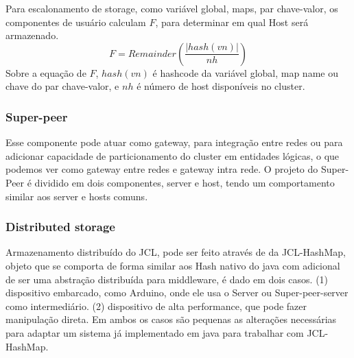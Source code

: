 \documentclass[12pt]{article}
\begin{document}

Para escalonamento de storage, como variável global, maps, par chave-valor, os componentes de usuário calculam \(F\), para determinar em qual Host será armazenado.
\begin{displaymath}
	F = Remainder\left ( \frac{\left | hash(vn) \right |}{nh} \right )
\end{displaymath}
Sobre a equação de \(F\), \(hash(vn)\) é hashcode da variável global, map name ou chave do par chave-valor, e \(nh\) é número de host disponíveis no cluster.


\subsubsection{Super-peer}
Esse componente pode atuar como gateway, para integração entre redes ou para adicionar capacidade de particionamento do cluster em entidades lógicas, o que podemos ver como gateway entre redes e gateway intra rede. O projeto do Super-Peer é dividido em dois componentes, server e host, tendo um comportamento similar aos server e hosts comuns.



\subsubsection{Distributed storage}
Armazenamento distribuído do JCL, pode ser feito através de da JCL-HashMap, objeto que se comporta de forma similar aos Hash nativo do java com adicional de ser uma abstração distribuída para middleware, é dado em dois casos. (1) dispositivo embarcado, como Arduino, onde ele usa o Server ou Super-peer-server como intermediário. (2) dispositivo de alta performance, que pode fazer manipulação direta. Em ambos os casos são pequenas as alterações necessárias para adaptar um sistema já implementado em java para trabalhar com JCL-HashMap.
\end{document}
